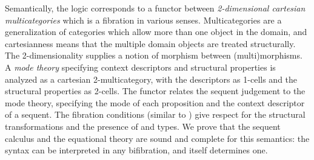 Semantically, the logic corresponds to a functor between
\emph{2-dimensional cartesian multicategories} which is a fibration in
various senses.  Multicategories are a generalization of categories
which allow more than one object in the domain, and cartesianness means
that the multiple domain objects are treated structurally.  The
2-dimensionality supplies a notion of morphism between (multi)morphisms.
A \emph{mode theory} specifying context descriptors and structural
properties is analyzed as a cartesian 2-multicategory, with the
descriptors as 1-cells and the structural properties as 2-cells.  The
functor relates the sequent judgement to the mode theory, specifying the
mode of each proposition and the context descriptor of a sequent.  The
fibration conditions (similar to
\citep{hermida02fibrations,hormann15multicategories}) give respect for
the structural transformations and the presence of  and 
types.  We prove that the sequent calculus and the equational theory are
sound and complete for this semantics: the syntax can be interpreted in
any bifibration, and itself determines one.

